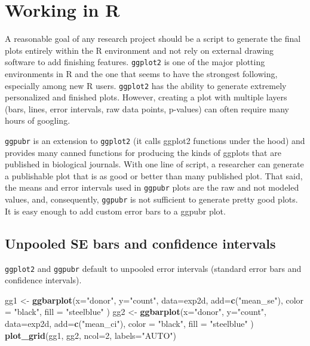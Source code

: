 \documentclass[]{book}
\newenvironment{Shaded}{\begin{snugshade}}{\end{snugshade}}
\newcommand{\KeywordTok}[1]{\textcolor[rgb]{0.13,0.29,0.53}{\textbf{#1}}}
\newcommand{\DataTypeTok}[1]{\textcolor[rgb]{0.13,0.29,0.53}{#1}}
\newcommand{\DecValTok}[1]{\textcolor[rgb]{0.00,0.00,0.81}{#1}}
\newcommand{\StringTok}[1]{\textcolor[rgb]{0.31,0.60,0.02}{#1}}
\newcommand{\NormalTok}[1]{#1}
\begin{document}
\section{Working in R}\label{working-in-r-2}

A reasonable goal of any research project should be a script to generate
the final plots entirely within the R environment and not rely on
external drawing software to add finishing features. \texttt{ggplot2} is
one of the major plotting environments in R and the one that seems to
have the strongest following, especially among new R users.
\texttt{ggplot2} has the ability to generate extremely personalized and
finished plots. However, creating a plot with multiple layers (bars,
lines, error intervals, raw data points, p-values) can often require
many hours of googling.

\texttt{ggpubr} is an extension to \texttt{ggplot2} (it calls ggplot2
functions under the hood) and provides many canned functions for
producing the kinds of ggplots that are published in biological
journals. With one line of script, a researcher can generate a
publishable plot that is as good or better than many published plot.
That said, the means and error intervals used in \texttt{ggpubr} plots
are the raw and not modeled values, and, consequently, \texttt{ggpubr}
is not sufficient to generate pretty good plots. It is easy enough to
add custom error bars to a ggpubr plot.

\subsection{Unpooled SE bars and confidence
intervals}\label{unpooled-se-bars-and-confidence-intervals}

\texttt{ggplot2} and \texttt{ggpubr} default to unpooled error intervals
(standard error bars and confidence intervals).

\begin{Shaded}
\begin{Highlighting}[]
\NormalTok{gg1 <-}\StringTok{ }\KeywordTok{ggbarplot}\NormalTok{(}\DataTypeTok{x=}\StringTok{"donor"}\NormalTok{, }
                 \DataTypeTok{y=}\StringTok{"count"}\NormalTok{, }
                 \DataTypeTok{data=}\NormalTok{exp2d,}
                 \DataTypeTok{add=}\KeywordTok{c}\NormalTok{(}\StringTok{"mean_se"}\NormalTok{),}
                 \DataTypeTok{color =} \StringTok{"black"}\NormalTok{,}
                 \DataTypeTok{fill =} \StringTok{"steelblue"}
\NormalTok{)}
\NormalTok{gg2 <-}\StringTok{ }\KeywordTok{ggbarplot}\NormalTok{(}\DataTypeTok{x=}\StringTok{"donor"}\NormalTok{, }
                 \DataTypeTok{y=}\StringTok{"count"}\NormalTok{, }
                 \DataTypeTok{data=}\NormalTok{exp2d,}
                 \DataTypeTok{add=}\KeywordTok{c}\NormalTok{(}\StringTok{"mean_ci"}\NormalTok{),}
                 \DataTypeTok{color =} \StringTok{"black"}\NormalTok{,}
                 \DataTypeTok{fill =} \StringTok{"steelblue"}
\NormalTok{)}
\KeywordTok{plot_grid}\NormalTok{(gg1, gg2, }\DataTypeTok{ncol=}\DecValTok{2}\NormalTok{, }\DataTypeTok{labels=}\StringTok{"AUTO"}\NormalTok{)}
\end{Highlighting}
\end{Shaded}
\end{document}
